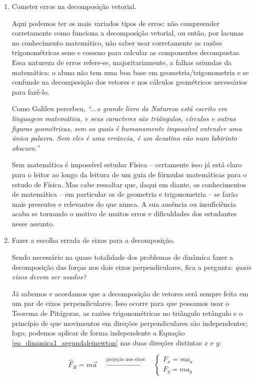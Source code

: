 \begin{enumerate}
    \item [(i)] Cometer erros na decomposição vetorial.

    Aqui podemos ter os mais variados tipos de erros: não compreender corretamente como funciona a decomposição vetorial, ou então, por lacunas no conhecimento matemático, não saber usar corretamente as razões trigonométricas seno e cosseno para calcular as componentes decompostas. Essa natureza de erros refere-se, majoritariamente, a falhas oriundas da matemática: o aluno não tem uma boa base em geometria/trigonometria e se confunde na decomposição dos vetores e nos cálculos geométricos necessários para fazê-lo.

    Como Galileu percebeu, \textit{``...o grande livro da Natureza está escrito em linguagem matemática, e seus caracteres são triângulos, círculos e outras figuras geométricas, sem os quais é humanamente impossível entender uma única palavra. Sem eles é uma errância, é um desatino vão num labirinto obscuro.''} 

    Sem matemática é impossível estudar Física -- certamente isso já está claro para o leitor ao longo da leitura de um guia de fórmulas matemáticas para o estudo de Física. Mas cabe ressaltar que, daqui em diante, os conhecimentos de matemática -- em particular os de geometria e trigonometria -- se farão mais presentes e relevantes do que nunca. A sua ausência ou insuficiência acaba se tornando o motivo de muitos erros e dificuldades dos estudantes nesse assunto.

    \item [(ii)] Fazer a escolha errada de eixos para a decomposição.


     Sendo necessário na quase totalidade dos problemas de dinâmica fazer a decomposição das forças nos dois eixos perpendiculares, fica a pergunta: \textit{quais eixos devem ser usados?}

 Já sabemos e acordamos que a decomposição de vetores será sempre feita em um par de eixos perpendiculares. Isso ocorre para que possamos usar o Teorema de Pitágoras, as razões trigonométricas no triângulo retângulo e o princípio de que movimentos em direções perpendiculares são independentes; logo, podemos aplicar de forma independente a Equação \eqref{eq_dinamica1_segundaleinewton} nas duas direções distintas $x$ e $y$:


\[
 \vec{F}_R = m\vec a
\quad \xrightarrow{\text{projeção nos eixos}}
\quad
\begin{cases}
F_x = m a_x \\
F_y = m a_y
\end{cases}
\]


\end{enumerate}
